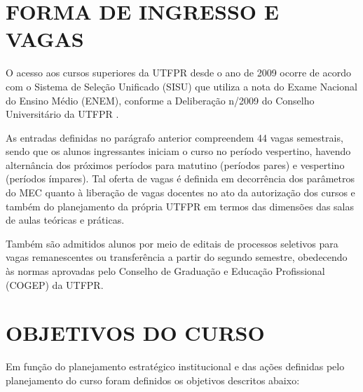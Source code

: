 \section{FORMA DE INGRESSO E VAGAS}

O acesso aos cursos superiores da UTFPR desde o ano de 2009 ocorre de acordo com o Sistema de Seleção Unificado (SISU) que utiliza a nota do Exame Nacional do Ensino Médio (ENEM), conforme a Deliberação n/2009 do Conselho Universitário da UTFPR \cite{sisuutfpr}.


As entradas definidas no parágrafo anterior compreendem 44 vagas semestrais, sendo que os alunos ingressantes iniciam o curso no período vespertino, havendo alternância dos próximos períodos para matutino (períodos pares) e vespertino (períodos ímpares). Tal oferta de vagas é definida em decorrência dos parâmetros do MEC quanto à liberação de vagas docentes no ato da autorização dos cursos e também do planejamento da própria UTFPR em termos das dimensões das salas de aulas teóricas e práticas.

Também são admitidos alunos por meio de editais de processos seletivos para vagas remanescentes ou transferência a partir do segundo semestre, obedecendo às normas aprovadas pelo Conselho de Graduação e Educação Profissional (COGEP) da UTFPR.

\section{OBJETIVOS DO CURSO}
\label{sec:obj}

Em função do planejamento estratégico institucional e das ações definidas pelo planejamento do curso foram definidos os objetivos descritos abaixo:

